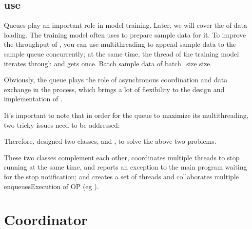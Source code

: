 \begin{content}
\subsection{use}

Queues play an important role in model training. Later, we will cover the  of data loading. The training model often uses  to prepare sample data for it. To improve the throughput of , you can use multithreading to append sample data to the sample queue concurrently; at the same time, the thread of the training model iterates through  and gets \code once. Batch sample data of {batch\_size} size.

Obviously, the queue plays the role of asynchronous coordination and data exchange in the  process, which brings a lot of flexibility to the design and implementation of .

It's important to note that in order for the queue to maximize its multithreading, two tricky issues need to be addressed:

\begin{enum}
\end{enum}

Therefore,  designed two classes,  and , to solve the above two problems.

These two classes complement each other,  coordinates multiple threads to stop running at the same time, and reports an exception to the main program waiting for the stop notification; and  creates a set of threads and collaborates multiple enqueues\ascii Execution of {OP} (eg ).

\end{content}

\section{Coordinator}

